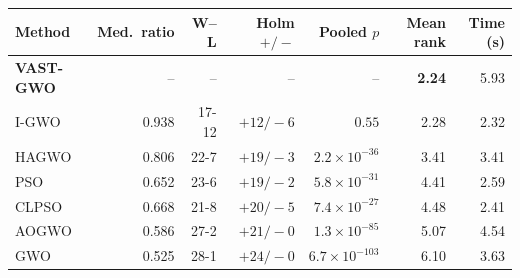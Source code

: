 \begin{tabular}{lrrrrrr}
\toprule
Method & Med.\ ratio & W--L & Holm $+/-$ & Pooled $p$ & Mean rank & Time (s)\\
\midrule
\textbf{VAST-GWO} & -- & -- & -- & -- & \textbf{2.24} & 5.93\\
I-GWO & 0.938 & 17-12 & $+12/-6$ & $0.55$ & 2.28 & 2.32\\
HAGWO & 0.806 & 22-7 & $+19/-3$ & $2.2\times10^{-36}$ & 3.41 & 3.41\\
PSO & 0.652 & 23-6 & $+19/-2$ & $5.8\times10^{-31}$ & 4.41 & 2.59\\
CLPSO & 0.668 & 21-8 & $+20/-5$ & $7.4\times10^{-27}$ & 4.48 & 2.41\\
AOGWO & 0.586 & 27-2 & $+21/-0$ & $1.3\times10^{-85}$ & 5.07 & 4.54\\
GWO & 0.525 & 28-1 & $+24/-0$ & $6.7\times10^{-103}$ & 6.10 & 3.63\\
\bottomrule
\end{tabular}

